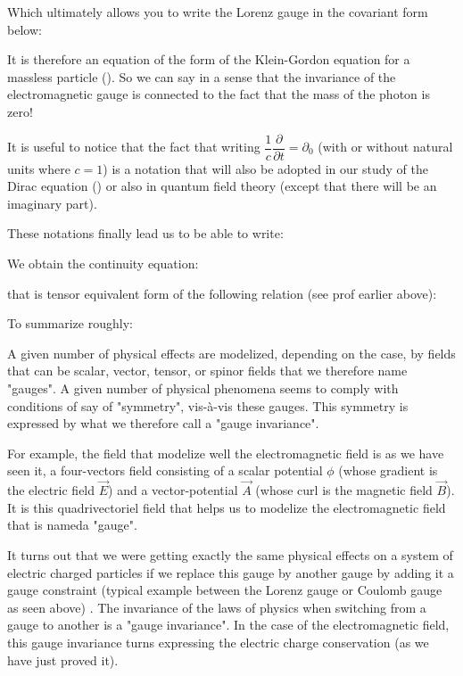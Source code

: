 	Which ultimately allows you to write the Lorenz gauge in the covariant form below:
	
	It is therefore an equation of the form of the Klein-Gordon equation for a massless particle (). So we can say in a sense that the invariance of the electromagnetic gauge is connected to the fact that the mass of the photon is zero!
	\begin{tcolorbox}[title=Remark,colframe=black,arc=10pt]
	It is useful to notice that the fact that writing $\dfrac{1}{c}\dfrac{\partial }{\partial t}=\partial_0$ (with or without natural units where $c=1$) is a notation that will also be adopted in our study of the Dirac equation () or also in quantum field theory (except that there will be an imaginary part).
	\end{tcolorbox}
	These notations finally lead us to be able to write:
	
	We obtain the continuity equation:
	
	that is tensor equivalent form of the following relation (see prof earlier above):
	
	To summarize roughly:
	
	A given number of physical effects are modelized, depending on the case, by fields that can be scalar, vector, tensor, or spinor fields that we therefore name "gauges". A given number of physical phenomena seems to comply with conditions of say of "symmetry", vis-à-vis these gauges. This symmetry is expressed by what we therefore call a "gauge invariance".

	For example, the field that modelize well the electromagnetic field is as we have seen it, a four-vectors field consisting of a scalar potential $\phi$ (whose gradient is the electric field $\vec{E}$) and a vector-potential $\vec{A}$ (whose curl is the magnetic field $\vec{B}$). It is this quadrivectoriel field that helps us to modelize the electromagnetic field that is nameda "gauge".

	It turns out that we were getting exactly the same physical effects on a system of electric charged particles if we replace this gauge by another gauge by adding it a gauge  constraint (typical example between the Lorenz gauge or Coulomb gauge as seen above) . The invariance of the laws of physics when switching from a gauge to another is a "gauge invariance". In the case of the electromagnetic field, this gauge invariance turns expressing the electric charge conservation (as we have just proved it).

